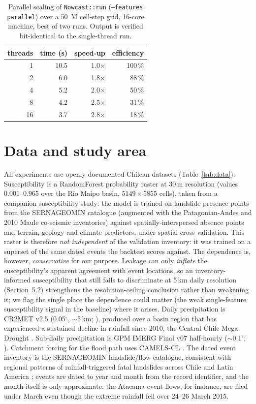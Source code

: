 \documentclass[authoryear,preprint,review,12pt]{elsarticle}
\begin{document}
\begin{table}[ht]
\centering
\caption{Parallel scaling of \texttt{Nowcast::run} (\texttt{--features parallel})
over a 50~M cell-step grid, 16-core machine, best of two runs. Output is verified
bit-identical to the single-thread run.}
\label{tab:scaling}
\begin{tabular}{@{}rrrr@{}}
\toprule
threads & time (s) & speed-up & efficiency \\
\midrule
1  & 10.5 & 1.0$\times$ & 100\,\% \\
2  & 6.0  & 1.8$\times$ & 88\,\% \\
4  & 5.2  & 2.0$\times$ & 50\,\% \\
8  & 4.2  & 2.5$\times$ & 31\,\% \\
16 & 3.7  & 2.8$\times$ & 18\,\% \\
\bottomrule
\end{tabular}
\end{table}

\section{Data and study area}

All experiments use openly documented Chilean datasets (Table~\ref{tab:data}).
Susceptibility is a RandomForest probability raster at 30\,m resolution (values
0.001--0.965 over the R\'io Maipo basin, $5149\times5855$ cells), taken from a
companion susceptibility study: the model is trained on landslide presence points
from the SERNAGEOMIN catalogue (augmented with the Patagonian-Andes and 2010 Maule
co-seismic inventories) against spatially-interspersed absence points and terrain,
geology and climate predictors, under spatial cross-validation. This raster is
therefore \emph{not independent} of the validation inventory: it was trained on a
superset of the same dated events the backtest scores against. The dependence is,
however, \emph{conservative} for our purpose. Leakage can only \emph{inflate} the
susceptibility's apparent agreement with event locations, so an inventory-informed
susceptibility that still fails to discriminate at 5\,km daily resolution
(Section~5.2) strengthens the resolution-ceiling conclusion rather than weakening
it; we flag the single place the dependence could matter (the weak single-feature
susceptibility signal in the baseline) where it arises. Daily
precipitation is CR2MET v2.5 (0.05$^\circ$, $\sim$5\,km; \citealp{boisier2018cr2met}), produced over a basin
region that has experienced a sustained decline in rainfall since 2010, the
Central Chile Mega Drought \citep{garreaud2019,boisier2018}.
Sub-daily precipitation is GPM IMERG Final v07 half-hourly ($\sim$0.1$^\circ$;
\citealp{huffman2020,tan2019}). Catchment forcing for the flood path uses CAMELS-CL
\citep{alvarez2018}. The dated event inventory is the SERNAGEOMIN
landslide/flow catalogue, consistent with regional patterns of rainfall-triggered
fatal landslides across Chile and Latin America \citep{sepulveda2015}; events are dated to year and month from the record
identifier, and the month itself is only approximate: the Atacama event flows,
for instance, are filed under March even though the extreme rainfall fell over
24--26 March 2015.
\end{document}
